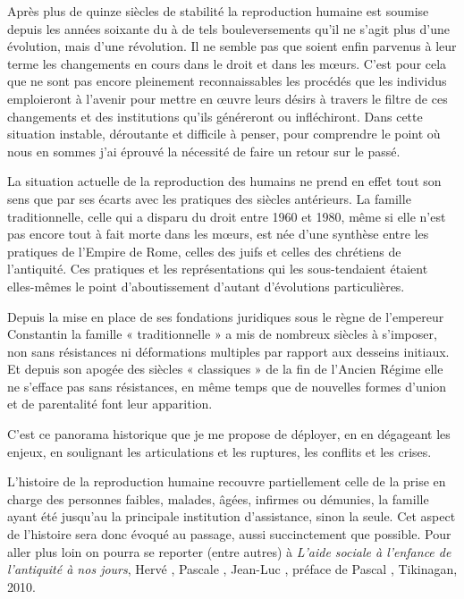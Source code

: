 Après plus de quinze siècles de stabilité la reproduction humaine
est soumise depuis les années soixante du  à de tels bouleversements
qu'il ne s'agit plus d'une évolution, mais d'une révolution. Il
ne semble pas que soient enfin parvenus à leur terme les changements en
cours dans le droit et dans les mœurs. C'est pour cela que ne sont pas
encore pleinement reconnaissables les procédés que les individus emploieront
à l'avenir pour mettre en œuvre leurs désirs à travers le filtre
de ces changements et des institutions qu'ils généreront ou infléchiront.
Dans cette situation instable, déroutante et difficile à penser, pour
comprendre le point où nous en sommes j'ai éprouvé la nécessité de faire
un retour sur le passé.

La situation actuelle de la reproduction des humains ne prend en
effet tout son sens que par ses écarts avec les pratiques des siècles antérieurs.
La famille traditionnelle, celle qui a disparu du droit entre 1960 et
1980, même si elle n'est pas encore tout à fait morte dans les mœurs, est
née d'une synthèse entre les pratiques de l'Empire de Rome, celles des
juifs et celles des chrétiens de l'antiquité. Ces pratiques et les représentations
qui les sous-tendaient étaient elles-mêmes le point d'aboutissement
d'autant d'évolutions particulières.

Depuis la mise en place de ses fondations juridiques sous le règne
de l'empereur Constantin la famille « traditionnelle » a mis de nombreux
siècles à s'imposer, non sans résistances ni déformations multiples par
rapport aux desseins initiaux. Et depuis son apogée des siècles « classiques »
de la fin de l'Ancien Régime elle ne s'efface pas sans résistances, en
même temps que de nouvelles formes d'union et de parentalité font leur
apparition.

C'est ce panorama historique que je me propose de déployer, en
en dégageant les enjeux, en soulignant les articulations et les ruptures, les
conflits et les crises.

L'histoire de la reproduction humaine recouvre partiellement celle
de la prise en charge des personnes faibles, malades, âgées, infirmes ou
démunies, la famille ayant été jusqu'au  la principale institution
d'assistance, sinon la seule. Cet aspect de l'histoire sera donc évoqué
au passage, aussi succinctement que possible. Pour aller plus loin on
pourra se reporter (entre autres) à \emph{L'aide sociale à l'enfance de l'antiquité à
nos jours},%
Hervé , Pascale , Jean-Luc ,
préface de Pascal , Tikinagan, 2010.

